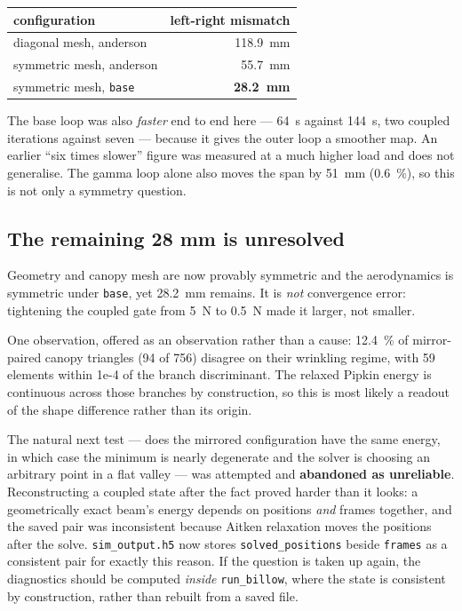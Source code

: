 \documentclass[11pt,a4paper]{article}
\newcommand{\code}[1]{\texttt{\small #1}}
\begin{document}
\begin{center}\small
\begin{tabular}{@{}lr@{}}
\toprule
\textbf{configuration} & \textbf{left-right mismatch} \\
\midrule
diagonal mesh, anderson & \SI{118.9}{\milli\metre} \\
symmetric mesh, anderson & \SI{55.7}{\milli\metre} \\
symmetric mesh, \code{base} & \textbf{\SI{28.2}{\milli\metre}} \\
\bottomrule
\end{tabular}
\end{center}

The base loop was also \emph{faster} end to end here --- \SI{64}{\second}
against \SI{144}{\second}, two coupled iterations against seven --- because it
gives the outer loop a smoother map. An earlier ``six times slower'' figure was
measured at a much higher load and does not generalise. The gamma loop alone
also moves the span by \SI{51}{\milli\metre} (\SI{0.6}{\percent}), so this is
not only a symmetry question.

\subsection{The remaining 28 mm is unresolved}

Geometry and canopy mesh are now provably symmetric and the aerodynamics is
symmetric under \code{base}, yet \SI{28.2}{\milli\metre} remains. It is
\emph{not} convergence error: tightening the coupled gate from \SI{5}{\newton}
to \SI{0.5}{\newton} made it larger, not smaller.

One observation, offered as an observation rather than a cause:
\SI{12.4}{\percent} of mirror-paired canopy triangles (94 of 756) disagree on
their wrinkling regime, with 59 elements within 1e-4 of the branch
discriminant. The relaxed Pipkin energy is continuous across those branches by
construction, so this is most likely a readout of the shape difference rather
than its origin.

The natural next test --- does the mirrored configuration have the same energy,
in which case the minimum is nearly degenerate and the solver is choosing an
arbitrary point in a flat valley --- was attempted and \textbf{abandoned as
unreliable}. Reconstructing a coupled state after the fact proved harder than it
looks: a geometrically exact beam's energy depends on positions \emph{and}
frames together, and the saved pair was inconsistent because Aitken relaxation
moves the positions after the solve. \code{sim\_output.h5} now stores
\code{solved\_positions} beside \code{frames} as a consistent pair for exactly
this reason. If the question is taken up again, the diagnostics should be
computed \emph{inside} \code{run\_billow}, where the state is consistent by
construction, rather than rebuilt from a saved file.
\end{document}
